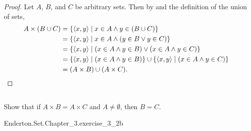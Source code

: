 \documentclass{report}
\begin{document}
  \begin{proof}
    Let $A$, $B$, and $C$ be arbitrary sets.
    Then by  and the definition of the union of sets,
      \begin{align*}
        A \times (B \cup C)
          & = \{ \left< x, y \right> \mid x \in A \land y \in (B \cup C) \} \\
          & = \{ \left< x, y \right> \mid
            x \in A \land (y \in B \lor y \in C) \} \\
          & = \{ \left< x, y \right> \mid
            (x \in A \land y \in B) \lor (x \in A \land y \in C) \} \\
          & = \{ \left< x, y \right> \mid (x \in A \land y \in B) \} \cup
            \{ \left< x, y \right> \mid (x \in A \land y \in C) \} \\
          & = (A \times B) \cup (A \times C).
      \end{align*}
  \end{proof}

\subsection{}%

  Show that if $A \times B = A \times C$ and $A \neq \emptyset$, then $B = C$.

    {Enderton.Set.Chapter\_3.exercise\_3\_2b}
\end{document}
